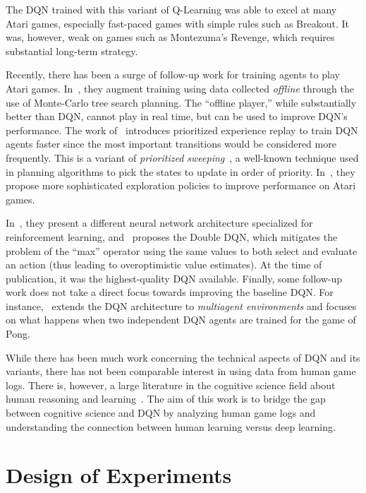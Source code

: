 \documentclass[letterpaper, 10 pt, conference]{ieeeconf}  %
\begin{document}
The DQN trained with this variant of Q-Learning was able to excel at many Atari games, especially
fast-paced games with simple rules such as Breakout. It was, however, weak on games such as
Montezuma's Revenge, which requires substantial long-term strategy.

Recently, there has been a surge of follow-up work for training agents to play Atari games.
In~\cite{nips-atari-2014}, they augment training using data collected \emph{offline} through the use
of Monte-Carlo tree search planning. The ``offline player,'' while substantially better than DQN,
cannot play in real time, but can be used to improve DQN's performance. The work
of~\cite{schaul2015prioritized} introduces prioritized experience replay to train DQN agents
faster since the most important transitions would be considered more frequently. This is a variant
of \emph{prioritized sweeping}~\cite{Moore93prioritizedsweeping}, a well-known technique used in
planning algorithms to pick the states to update in order of priority.
In~\cite{stadie2015incentivizing}, they propose more sophisticated exploration policies to improve
performance on Atari games.

In~\cite{wang2015dueling}, they present a different neural network architecture specialized for
reinforcement learning, and~\cite{van2015deep} proposes the Double DQN, which mitigates the problem
of the ``max'' operator using the same values to both select and evaluate an action (thus leading to
overoptimistic value estimates). At the time of publication, it was the highest-quality DQN
available. Finally, some follow-up work does not take a direct focus towards improving the baseline
DQN. For instance,~\cite{tampuu2015multiagent} extends the DQN architecture to \emph{multiagent
environments} and focuses on what happens when two independent DQN agents are trained for the game
of Pong.

While there has been much work concerning the technical aspects of DQN and its variants, there has
not been comparable interest in using data from human game logs. There is, however, a large
literature in the cognitive science field about human reasoning and learning~\cite{stenninghuman}.
The aim of this work is to bridge the gap between cognitive science and DQN by analyzing human game
logs and understanding the connection between human learning versus deep learning.


\section{Design of Experiments}\label{sec:experiments}
\end{document}
